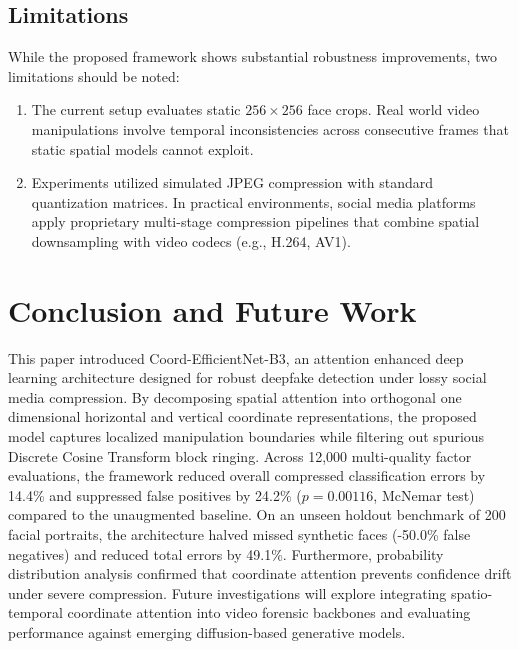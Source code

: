 \documentclass[conference]{IEEEtran}
\begin{document}
\subsection{Limitations}
While the proposed framework shows substantial robustness improvements, two limitations should be noted:
\begin{enumerate}
    \item The current setup evaluates static $256 \times 256$ face crops. Real world video manipulations involve temporal inconsistencies across consecutive frames that static spatial models cannot exploit.
    \item Experiments utilized simulated JPEG compression with standard quantization matrices. In practical environments, social media platforms apply proprietary multi-stage compression pipelines that combine spatial downsampling with video codecs (e.g., H.264, AV1).
\end{enumerate}

\section{Conclusion and Future Work}
This paper introduced Coord-EfficientNet-B3, an attention enhanced deep learning architecture designed for robust deepfake detection under lossy social media compression. By decomposing spatial attention into orthogonal one dimensional horizontal and vertical coordinate representations, the proposed model captures localized manipulation boundaries while filtering out spurious Discrete Cosine Transform block ringing. Across 12,000 multi-quality factor evaluations, the framework reduced overall compressed classification errors by 14.4\% and suppressed false positives by 24.2\% ($p = 0.00116$, McNemar test) compared to the unaugmented baseline. On an unseen holdout benchmark of 200 facial portraits, the architecture halved missed synthetic faces (-50.0\% false negatives) and reduced total errors by 49.1\%. Furthermore, probability distribution analysis confirmed that coordinate attention prevents confidence drift under severe compression. Future investigations will explore integrating spatio-temporal coordinate attention into video forensic backbones and evaluating performance against emerging diffusion-based generative models.
\end{document}
